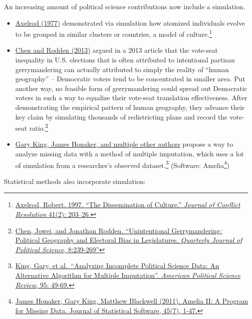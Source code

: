 \documentclass[
  letterpaper,
]{book}
\providecommand{\tightlist}{%
  \setlength{\itemsep}{0pt}\setlength{\parskip}{0pt}}\usepackage{longtable,booktabs,array}
\theoremstyle{definition}
\theoremstyle{definition}
\theoremstyle{plain}
\theoremstyle{definition}
\theoremstyle{plain}
\theoremstyle{plain}
\theoremstyle{remark}
\begin{document}
An increasing amount of political science contributions now include a
simulation.

\begin{itemize}
\tightlist
\item
  \href{http://www-personal.umich.edu/~axe/research/Dissemination.pdf}{Axelrod
  (1977)} demonstrated via simulation how atomized individuals evolve to
  be grouped in similar clusters or countries, a model of
  culture.\footnote{\href{http://www-personal.umich.edu/~axe/research/Dissemination.pdf}{Axelrod,
    Robert. 1997. ``The Dissemination of Culture.'' \emph{Journal of
    Conflict Resolution} 41(2): 203--26.}}
\item
  \href{http://www-personal.umich.edu/~jowei/florida.pdf}{Chen and
  Rodden (2013)} argued in a 2013 article that the vote-seat inequality
  in U.S. elections that is often attributed to intentional partisan
  gerrymandering can actually attributed to simply the reality of
  ``human geography'' -- Democratic voters tend to be concentrated in
  smaller area. Put another way, no feasible form of gerrymandering
  could spread out Democratic voters in such a way to equalize their
  vote-seat translation effectiveness. After demonstrating the empirical
  pattern of human geography, they advance their key claim by simulating
  thousands of redistricting plans and record the vote-seat
  ratio.\footnote{\href{http://www-personal.umich.edu/~jowei/florida.pdf}{Chen,
    Jowei, and Jonathan Rodden. ``Unintentional Gerrymandering:
    Political Geography and Electoral Bias in Legislatures.
    \emph{Quarterly Journal of Political Science}, 8:239-269''}}
\item
  \href{https://gking.harvard.edu/files/abs/evil-abs.shtml}{Gary King,
  James Honaker, and multiple other authors} propose a way to analyze
  missing data with a method of multiple imputation, which uses a lot of
  simulation from a researcher's observed dataset.\footnote{\href{https://gking.harvard.edu/files/abs/evil-abs.shtml}{King,
    Gary, et al.~``Analyzing Incomplete Political Science Data: An
    Alternative Algorithm for Multiple Imputation''. \emph{American
    Political Science Review}, 95: 49-69.}} (Software:
  Amelia\footnote{\href{http://www.jstatsoft.org/v45/i07/}{James
    Honaker, Gary King, Matthew Blackwell (2011). Amelia II: A Program
    for Missing Data. Journal of Statistical Software, 45(7), 1-47.}})
\end{itemize}

Statistical methods also incorporate simulation:
\end{document}
